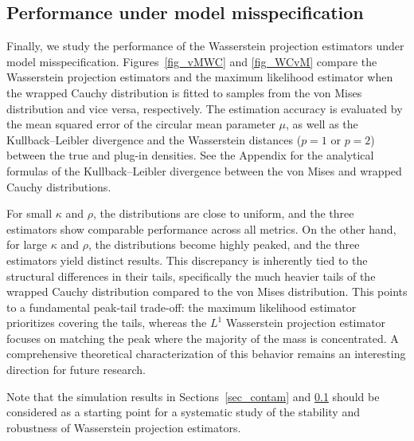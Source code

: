 \documentclass[11pt, a4paper]{article}
\begin{document}
\subsection{Performance under model misspecification}\label{sec_mis}
Finally, we study the performance of the Wasserstein projection estimators under model misspecification. 
Figures~\ref{fig_vMWC} and \ref{fig_WCvM} compare the Wasserstein projection estimators and the maximum likelihood estimator when the wrapped Cauchy distribution is fitted to samples from the von Mises distribution and vice versa, respectively. 
The estimation accuracy is evaluated by the mean squared error of the circular mean parameter $\mu$, as well as the Kullback--Leibler divergence and the Wasserstein distances ($p=1$ or $p=2$) between the true and plug-in densities. 
See the Appendix for the analytical formulas of the Kullback--Leibler divergence between the von Mises and wrapped Cauchy distributions.

For small $\kappa$ and $\rho$, the distributions are close to uniform, and the three estimators show comparable performance across all metrics. On the other hand, for large $\kappa$ and $\rho$, the distributions become highly peaked, and the three estimators yield distinct results. This discrepancy is inherently tied to the structural differences in their tails, specifically the much heavier tails of the wrapped Cauchy distribution compared to the von Mises distribution. This points to a fundamental peak-tail trade-off: the maximum likelihood estimator prioritizes covering the tails, whereas the $L^1$ Wasserstein projection estimator focuses on matching the peak where the majority of the mass is concentrated. A comprehensive theoretical characterization of this behavior remains an interesting direction for future research.

Note that the simulation results in Sections~\ref{sec_contam} and \ref{sec_mis} should be considered as a starting point for a systematic study of the stability and robustness of Wasserstein projection estimators.
\end{document}

